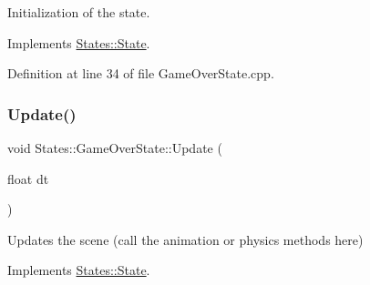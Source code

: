 Initialization of the state. 

\begin{DoxyVerb}\end{DoxyVerb}
 

Implements \mbox{\hyperlink{class_states_1_1_state_aff396dd3b4f3f7f7e729a0eac1910f45}{States\+::\+State}}.



Definition at line 34 of file Game\+Over\+State.\+cpp.


\begin{DoxyCode}{0}

\end{DoxyCode}
\mbox{\label{class_states_1_1_game_over_state_a8efab9044baa73dbe979b6da0aa9a041}} 
\subsubsection{\texorpdfstring{Update()}{Update()}}
{\footnotesize\ttfamily void States\+::\+Game\+Over\+State\+::\+Update (\begin{DoxyParamCaption}\item[{float}]{dt }\end{DoxyParamCaption})\hspace{0.3cm}{\ttfamily [virtual]}}



Updates the scene (call the animation or physics methods here) 

\begin{DoxyVerb}\end{DoxyVerb}
 

Implements \mbox{\hyperlink{class_states_1_1_state_ab8e935def8138e0b917c3228a29904e4}{States\+::\+State}}.



